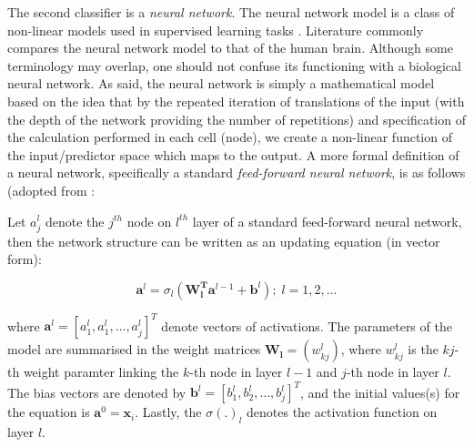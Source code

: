 The second classifier is a \textit{ neural network}. The neural network model is a class of non-linear models used in supervised learning tasks \citep{et2020analytics}. Literature commonly compares the neural network model to that of the human brain. Although some terminology may overlap, one should not confuse its functioning with a biological neural network. As \citet{et2020analytics} said, the neural network is simply a mathematical model based on the idea that by the repeated iteration of translations of the input (with the depth of the network providing the number of repetitions) and specification of the calculation performed in each cell (node), we create a non-linear function of the input/predictor space which maps to the output. A more formal definition of a neural network, specifically a standard \textit{feed-forward neural network}, is as follows (adopted from \citep{et2020analytics}:

Let $a^l_j$ denote the $j^{th}$ node on $l^{th}$ layer of a standard feed-forward neural network, then the network structure can be written as an updating equation (in vector form):

$$\boldsymbol{a}^l = \sigma_l(\boldsymbol{W^T_l}\boldsymbol{a}^{l-1}+\boldsymbol{b}^l);\; l = 1,2,\ldots$$

where  $\boldsymbol{a}^l = [a^l_1,a^l_1,\ldots,a^l_j]^T$ denote vectors of activations. The parameters of the model are summarised in the weight matrices $\boldsymbol{W_l} = (w^l_{kj})$, where $w^l_{kj}$ is the $kj$-th weight paramter linking the $k$-th node in layer $l-1$ and $j$-th node in layer $l$. The bias vectors are denoted by $\boldsymbol{b}^l = [b^l_1,b^l_2,\ldots,b^l_j]^T$, and the initial values(s) for the equation is $\boldsymbol{a}^0 = \boldsymbol{x}_i$. Lastly, the $\sigma(.)_l$ denotes the activation function on layer $l$.


